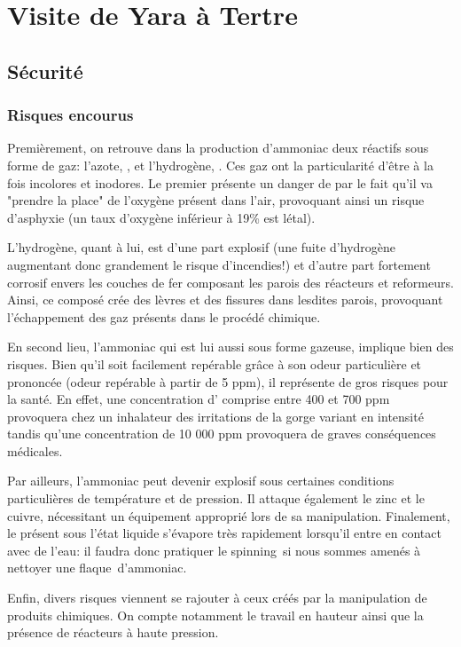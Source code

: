 \section{Visite de Yara à Tertre}
\subsection{Sécurité}
	\subsubsection{Risques encourus}
		Premièrement, on retrouve dans la production d'ammoniac deux réactifs sous forme de gaz: l'azote, , et l'hydrogène, . Ces gaz ont la particularité d'être à la fois incolores et inodores. Le premier présente un danger de par le fait qu'il va "prendre la place" de l'oxygène présent dans l'air, provoquant ainsi un risque d'asphyxie (un taux d'oxygène inférieur à 19\% est létal). 
		
		L'hydrogène, quant à lui, est d'une part explosif (une fuite d'hydrogène augmentant donc grandement le risque d'incendies!) et d'autre part fortement corrosif envers les couches de fer composant les parois des réacteurs et reformeurs. Ainsi, ce composé crée des lèvres et des fissures dans lesdites parois, provoquant l'échappement des gaz présents dans le procédé chimique.
		
		En second lieu, l'ammoniac qui est lui aussi sous forme gazeuse, implique bien des risques. Bien qu'il soit facilement repérable grâce à son odeur particulière et prononcée (odeur repérable à partir de 5 ppm), il représente de gros risques pour la santé. En effet, une concentration d' comprise entre 400 et 700 ppm provoquera chez un inhalateur des irritations de la gorge variant en intensité tandis qu'une concentration de 10 000 ppm provoquera de graves conséquences médicales.
		
		Par ailleurs, l'ammoniac peut devenir explosif sous certaines conditions particulières de température et de pression. Il attaque également le zinc et le cuivre, nécessitant un équipement approprié lors de sa manipulation. Finalement, le  présent sous l'état liquide s'évapore très rapidement lorsqu'il entre en contact avec de l'eau: il faudra donc pratiquer le \og spinning\fg \ si nous sommes amenés à nettoyer une \og flaque\fg \ d'ammoniac.
		
		Enfin, divers risques viennent se rajouter à ceux créés par la manipulation de produits chimiques. On compte notamment le travail en hauteur ainsi que la présence de réacteurs à haute pression.
		
